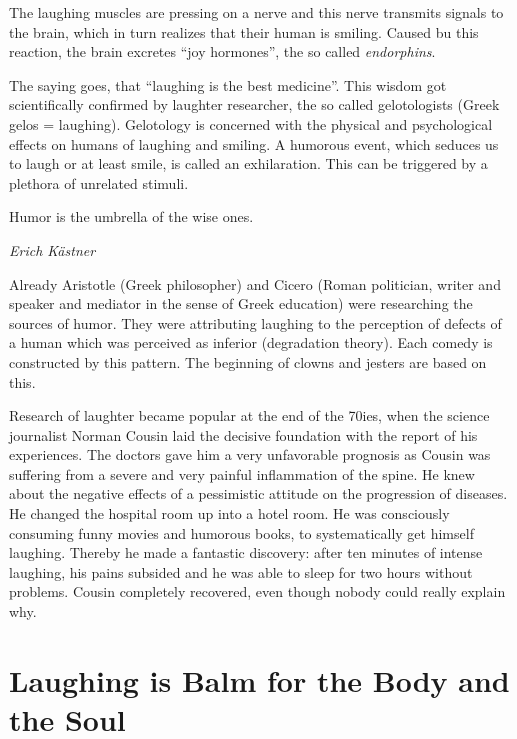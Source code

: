 \documentclass[../main.tex]{subfiles}
\begin{document}
\label{Ex:Laughing}
The laughing muscles are pressing on a nerve and this nerve transmits signals to the brain, which in turn realizes that their human is smiling.
Caused bu this reaction, the brain excretes ``joy hormones'', the so called \emph{endorphins}.

The saying goes, that ``laughing is the best medicine''.
This wisdom got scientifically confirmed by laughter researcher, the so called gelotologists (Greek gelos = laughing).
Gelotology is concerned with the physical and psychological effects on humans of laughing and smiling.
A humorous event, which seduces us to laugh or at least smile, is called an exhilaration.
This can be triggered by a plethora of unrelated stimuli.

\epigraph{Humor is the umbrella of the wise ones.}{\textit{Erich K\"astner}}

Already Aristotle (Greek philosopher) and Cicero
(Roman politician, writer and speaker and mediator in the sense of Greek education) were researching the sources of humor.
They were attributing laughing to the perception of defects of a human which was perceived as inferior (degradation theory).
Each comedy is constructed by this pattern.
The beginning of clowns and jesters are based on this.

Research of laughter became popular at the end of the 70ies, when the science journalist Norman Cousin laid the decisive foundation with the report of his experiences.
The doctors gave him a very unfavorable prognosis as Cousin was suffering from a severe and very painful inflammation of the spine.
He  knew about the negative effects of a pessimistic attitude on the progression of diseases.
He changed the hospital room up into a hotel room.
He was consciously consuming funny movies and humorous books, to systematically get himself laughing.
Thereby he made a fantastic discovery: after ten minutes of intense laughing, his pains subsided and he was able to sleep for two hours without problems.
Cousin completely recovered, even though nobody could really explain why.

\section{Laughing is Balm for the Body and the Soul}
\end{document}

